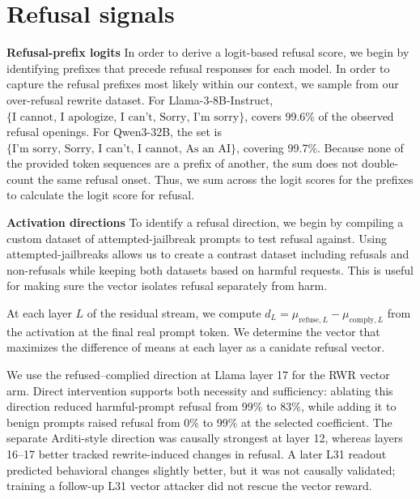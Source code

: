 \documentclass{article}
\begin{document}
\section{Refusal signals}

\textbf{Refusal-prefix logits} In order to derive a logit-based refusal score, we begin by identifying prefixes that precede refusal responses for each model. In order to capture the refusal prefixes most likely within our context, we sample from our over-refusal rewrite dataset. For Llama-3-8B-Instruct, \\ \(\{\text{I cannot, I apologize, I can't, Sorry, I'm sorry}\}\), covers 99.6\% of the observed refusal openings. For Qwen3-32B, the set is \(\{\text{I'm sorry, Sorry, I can't, I cannot, As an AI}\}\), covering 99.7\%. Because none of the provided token sequences are a prefix of another, the sum does not double-count the same refusal onset. Thus, we sum across the logit scores for the prefixes to calculate the logit score for refusal.


\textbf{Activation directions} To identify a refusal direction, we begin by compiling a custom dataset of attempted-jailbreak prompts to test refusal against. Using attempted-jailbreaks allows us to create a contrast dataset including refusals and non-refusals while keeping both datasets based on harmful requests. This is useful for making sure the vector isolates refusal separately from harm.

At each layer \(L\) of the residual stream, we compute \(d_L=\mu_{\mathrm{refuse},L}-\mu_{\mathrm{comply},L}\) from the activation at the final real prompt token. We determine the vector that maximizes the difference of means at each layer as a canidate refusal vector.

We use the refused--complied direction at Llama layer 17 for the RWR vector arm. Direct intervention supports both necessity and sufficiency: ablating this direction reduced harmful-prompt refusal from 99\% to 83\%, while adding it to benign prompts raised refusal from 0\% to 99\% at the selected coefficient. The separate Arditi-style direction was causally strongest at layer 12, whereas layers 16--17 better tracked rewrite-induced changes in refusal. A later L31 readout predicted behavioral changes slightly better, but it was not causally validated; training a follow-up L31 vector attacker did not rescue the vector reward.
\end{document}
